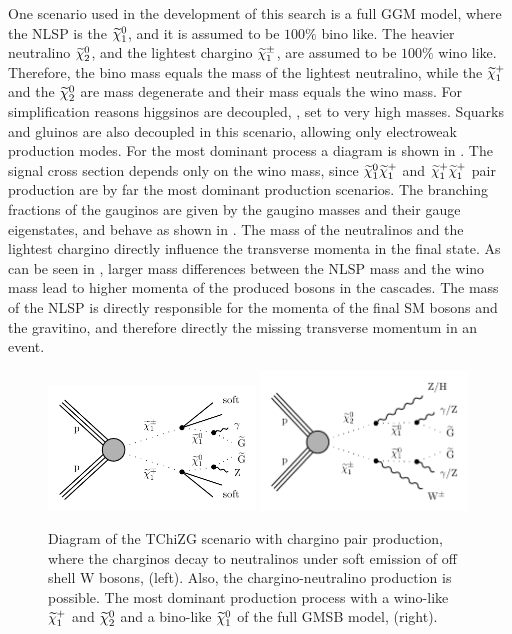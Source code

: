 \begin{enumerate}
One scenario used in the development of this search is a full GGM model, where the NLSP is the $\widetilde{\chi}^{0}_{1}$, and it is assumed to be $100\%$ bino like. The heavier neutralino $\widetilde{\chi}^{0}_{2}$, and the lightest chargino $\widetilde{\chi}^\pm_{1}$, are assumed to be $100\%$ wino like. Therefore, the bino mass equals the mass of the lightest neutralino, while the $\widetilde{\chi}^{+}_{1}$ and the $\widetilde{\chi}^{0}_{2}$ are mass degenerate and their mass equals the wino mass. For simplification reasons higgsinos are decoupled, \ie, set to very high masses. Squarks and gluinos are also decoupled in this scenario, allowing only electroweak production modes. For the most dominant process a diagram is shown in . The signal cross section depends only on the wino mass, since $\widetilde{\chi}^{0}_{1}\widetilde{\chi}^{+}_{1}$ and $\widetilde{\chi}^{+}_{1}\widetilde{\chi}^{+}_{1}$ pair production are by far the most dominant production scenarios. The branching fractions of the gauginos are given by the gaugino masses and their gauge eigenstates, and behave as shown in . The mass of the neutralinos and the lightest chargino directly influence the transverse momenta in the final state. As can be seen in , larger mass differences between the NLSP mass and the wino mass lead to higher momenta of the produced bosons in the cascades. The mass of the NLSP is directly responsible for the momenta of the final SM bosons and the gravitino, and therefore directly the missing transverse momentum in an event.
\begin{figure}[tbp]
 \centering
 \includegraphics[width=0.49\textwidth]{figures/signal/TChiNG}
 \includegraphics[width=0.49\textwidth]{figures/signal/gmsb}
 \caption{Diagram of the TChiZG scenario with chargino pair production, where the charginos decay to neutralinos under soft emission of off shell W bosons, (left). Also, the chargino-neutralino production is possible. The most dominant production process with a wino-like $\widetilde{\chi}^{+}_{1}$ and $\widetilde{\chi}^{0}_{2}$ and a bino-like $\widetilde{\chi}^{0}_{1}$ of the full GMSB model, (right).}

\end{figure}
\end{enumerate}

